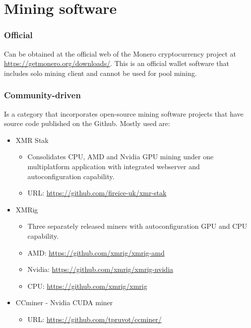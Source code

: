 \documentclass[
  printed, %
  table,   %
  lof,     %
  lot,     %
           oneside, color
]{fithesis3}
\begin{document}
\section{Mining software}
\subsubsection{Official}
Can be obtained at the official web of the Monero cryptocurrency project at \url{https://getmonero.org/downloads/}. This is an official wallet software that includes solo mining client and cannot be used for pool mining.

\subsubsection{Community-driven}
\label{cha:miningsoftware}
Is a category that incorporates open-source mining software projects that have source code published on the Github. Mostly used are:

\begin{itemize}\itemsep0em
\item XMR Stak 
\begin{itemize}\itemsep0em \item Consolidates CPU, AMD and Nvidia GPU mining under one multiplatform application with integrated webserver and autoconfiguration capability. \item URL: \url{https://github.com/fireice-uk/xmr-stak} \end{itemize}
\setlength\itemsep{1em}
\item XMRig 
\setlength\itemsep{0em}
\begin{itemize}\itemsep0em \item Three separately released miners with autoconfiguration GPU and CPU capability. \item AMD: \url{https://github.com/xmrig/xmrig-amd} 
 \item Nvidia: \url{https://github.com/xmrig/xmrig-nvidia} \item CPU: \url{https://github.com/xmrig/xmrig} \end{itemize}
\item CCminer - Nvidia CUDA miner
\begin{itemize}\itemsep0em \item URL: \url{https://github.com/tpruvot/ccminer/} \end{itemize}
\end{itemize}
\end{document}
